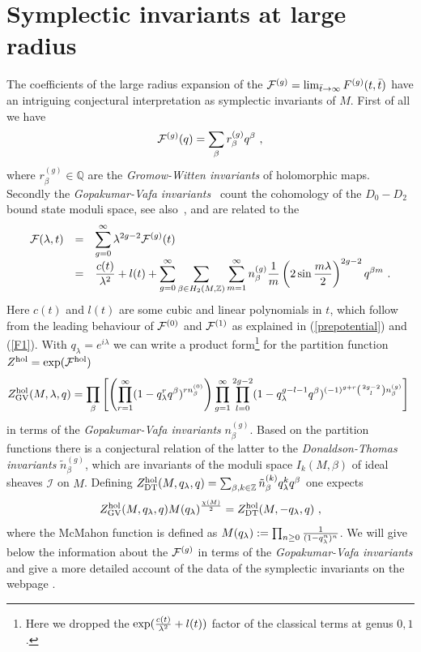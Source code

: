 \documentclass[12pt]{article}
\def\ZZ{{\mathbb Z}}
\newcommand{\ds}{\displaystyle}
\newcommand{\cF}{{\cal F}}
\def\cI{\mathcal{I}}
\begin{document}
\section{Symplectic invariants at large radius}
\label{symplecticinvariants} The coefficients of the large radius
expansion of the $\cF^{(g)}=\lim_{{\bar t}\rightarrow \infty}
F^{(g)}(t,\bar t)$  have an intriguing conjectural interpretation
as symplectic invariants of $M$. First of all we have
\begin{equation}
\cF^{(g)}(q)=\sum_{\beta} r_\beta^{(g)} q^{\beta}\ ,
\end{equation}
where $r^{(g)}_\beta\in \mathbb{Q}$ are the {\sl Gromow-Witten
invariants} of holomorphic maps. Secondly the {\sl Gopakumar-Vafa
invariants}~\cite{GVII} count the cohomology of the $D_0-D_2$
bound state moduli space, see also~\cite{Katz:1999},  and are
related to the
\begin{equation}
\begin{array}{rcl}
\cF(\lambda,t)&=&\ds{\sum_{g=0}^\infty \lambda^{2 g-2} \cF^{(g)}}(t)\\
&=&\ds{{c(t)\over \lambda^2}+l(t)+\sum_{g=0}^\infty \sum_{\beta\in H_2(M,\ZZ)}\sum_{m=1}^\infty n_{\beta}^{(g)} {1\over m}
\left(2 \sin {m \lambda \over 2}\right)^{2 g-2}  q^{\beta m}}\ .
\end{array}
\label{schwingerloopd2d0}
\end{equation}
Here $c(t)$ and $l(t)$ are some cubic and linear polynomials in $t$, which follow
from the leading behaviour of $\cF^{(0)}$ and $\cF^{(1)}$  as explained in (\ref{prepotential})
and (\ref{F1}).
With $q_\lambda=e^{i\lambda}$ we can write a product form\footnote{Here we dropped the $\exp({c(t)\over \lambda^2}+l(t))$
factor of the classical terms  at genus $0,1$.} for the partition function $Z^{\rm hol}=\exp(\cF^{\rm hol})$
\begin{equation}
Z^{\rm hol}_{\rm GV}(M,\lambda,q)=\prod_{\beta}\left[
\left(\prod_{r=1}^\infty (1-q_\lambda^r q^\beta)^{r n_\beta^{(0)}}\right)
\prod_{g=1}^\infty \prod_{l=0}^{2g-2}(1-q_\lambda^{ g-l-1} q^\beta)^{(-1)^{g+r}
\left(2 g-2\atop l\right) n_\beta^{(g)}}\right]\
\label{zhol}
\end{equation}
in terms of the {\sl Gopakumar-Vafa invariants} $n_\beta^{(g)}$. Based on the partition
functions there is a conjectural relation of the latter to the {\sl Donaldson-Thomas invariants}
$\tilde n_\beta^{(g)}$, which are invariants of the moduli space $I_k(M,\beta)$ of
ideal sheaves $\cI$ on $M$.  Defining $Z^{\rm hol}_{\rm DT}(M,q_{\lambda},q)=
\sum_{\beta,k\in {\ZZ}} {\tilde n}^{(k)}_{\beta} q_\lambda^k q^\beta$ one expects~\cite{DTGW}
\begin{equation}
Z^{\rm hol}_{\rm GV}(M,q_{\lambda},q)M(q_\lambda)^{\frac{\chi(M)}{2}}=Z^{\rm hol}_{\rm DT}(M,-q_{\lambda},q)\ ,
\label{eq:GVDT}
\end{equation}
where the McMahon function  is defined as $M(q_\lambda):=\prod_{n\ge 0} {1\over (1-q_\lambda^n)^n}$.
We will give below the information about the ${\cal F}^{(g)}$ in terms of the
{\sl Gopakumar-Vafa invariants} and give a  more detailed account of the data
of  the symplectic invariants on the webpage \cite{webpage}.
\end{document}
